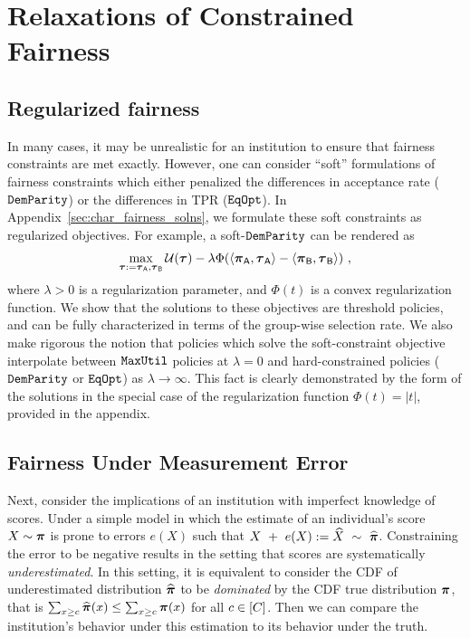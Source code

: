 


\section{Relaxations of Constrained Fairness}
\subsection{Regularized fairness} 
In many cases, it may be unrealistic for an institution to ensure that fairness constraints are met exactly. However, one can consider ``soft'' formulations of fairness constraints which either penalized the differences in acceptance rate ($\mathtt{DemParity}$) or the differences in TPR ($\mathtt{EqOpt}$). In Appendix~\ref{sec:char_fairness_solns}, we formulate these soft constraints as regularized objectives. For example, a soft-$\mathtt{DemParity}$ can be rendered as
\begin{eqnarray}
\max_{\boldsymbol{\tau} := \boldsymbol{\tau}_{\mathsf{A}},\boldsymbol{\tau}_{\mathsf{B}}} \mathcal{U}(\boldsymbol{\tau}) - \lambda \Phi(\langle \boldsymbol{\pi}_{\mathsf{A}},\boldsymbol{\tau}_{\mathsf{A}} \rangle -\langle \boldsymbol{\pi}_{\mathsf{B}},\boldsymbol{\tau}_{\mathsf{B}} \rangle )~,
\end{eqnarray}
where $\lambda > 0$ is a regularization parameter, and $\Phi(t)$ is a convex regularization function. We show that the solutions to these objectives are threshold policies, and can be fully characterized in terms of the group-wise selection rate. We also make rigorous the notion that policies which solve the soft-constraint objective interpolate between $\mathtt{MaxUtil}$ policies at $\lambda = 0$ and hard-constrained policies ($\mathtt{DemParity}$ or $\mathtt{EqOpt}$) as $\lambda \to \infty$. This fact is clearly demonstrated by the form of the solutions in the special case of the regularization function $\Phi(t) = |t|$, provided in the appendix.

\subsection{Fairness Under Measurement Error} 
Next, consider the implications of an institution with imperfect knowledge of scores. Under a simple model in which the estimate of an individual's score $X\sim\boldsymbol{\pi}$ is prone to errors $e(X)$ such that $X~+~e(X):=\widehat X~\sim~\widehat{\boldsymbol{\pi}}$. Constraining the error to be negative results in the setting that scores are systematically \emph{underestimated}. In this setting, it is equivalent to consider the CDF of underestimated distribution $\widehat{\boldsymbol{\pi}}$ to be \emph{dominated} by the CDF true distribution $\boldsymbol{\pi}$, that is $\sum_{x \ge c} \widehat{\boldsymbol{\pi}}(x) \le \sum_{x \ge c} \boldsymbol{\pi}(x)$ for all $c \in [C]$. Then we can compare the institution's behavior under this estimation to its behavior under the truth. 


